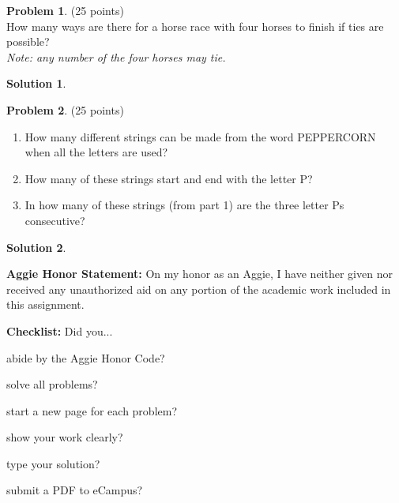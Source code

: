 \documentclass{article}
\theoremstyle{definition}
\newtheorem{problem}{Problem}
\newtheorem*{solution}{Solution}
\newcommand{\honor}{\noindent \textbf{Aggie Honor Statement: }On my honor as an Aggie, I have neither
  given nor received any unauthorized aid on any portion of the academic work included in this assignment.
}
\newcommand{\checklist}{\noindent\textbf{Checklist:}
Did you...
\begin{compactenum}
\item abide by the Aggie Honor Code?
\item solve all problems?
\item start a new page for each problem?
\item show your work clearly?
\item type your solution?
\item submit a PDF to eCampus?
\end{compactenum}
}
\begin{document}
\newpage

\begin{problem} (25 points)\\
How many ways are there for a horse race with four horses to finish if ties are possible?\\
\textit{Note: any number of the four horses may tie.}
\end{problem}

\begin{solution}\ \\
\end{solution}

\newpage

\begin{problem} (25 points)
\begin{enumerate}
\item 
How many different strings can be made from the word PEPPERCORN when all the letters are used?

\item
How many of these strings start and end with the letter P?

\item
In how many of these strings (from part 1) are the three letter Ps consecutive?
\end{enumerate}
\end{problem}

\begin{solution}\ \\
\end{solution}


\bigskip
\honor

\bigskip
\checklist
\end{document}
